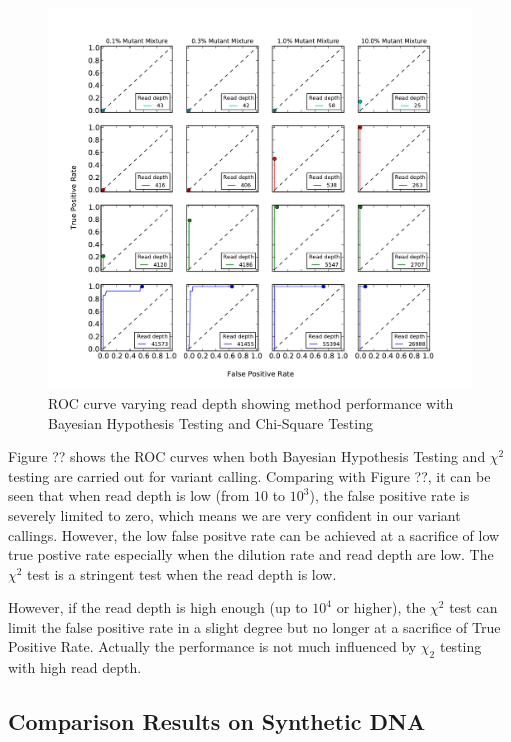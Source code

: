 \documentclass[11pt,reqno]{amsart}
\begin{document}
\begin{figure}[h] %
\begin{center}
\includegraphics[width=160mm]{pdf_figs/ROC_subplots_with_chi2.pdf}
\caption{ROC curve varying read depth showing method performance with Bayesian Hypothesis Testing and Chi-Square Testing}
\label{fig:R}
\end{center}
\end{figure}

Figure ?? shows the ROC curves when both Bayesian Hypothesis Testing and $\chi^2$ testing are carried out for variant calling. Comparing with Figure ??, it can be seen that when read depth is low (from $10$ to $10^3$), the false positive rate is severely limited to zero, which means we are very confident in our variant callings. However, the low false positve rate can be achieved at a sacrifice of low true postive rate especially when the dilution rate and read depth are low. The $\chi^2$ test is a stringent test when the read depth is low.

However, if the read depth is high enough (up to $10^4$ or higher), the $\chi^2$ test can limit the false positive rate in a slight degree but no longer at a sacrifice of True Positive Rate. Actually the performance is not much influenced by $\chi_2$ testing with high read depth.

\subsection{Comparison Results on Synthetic DNA}\
\end{document}
